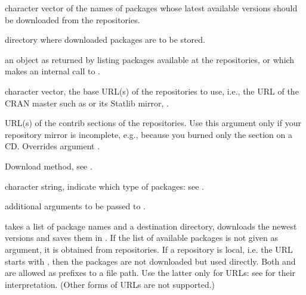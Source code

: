 \begin{Arguments}
\begin{ldescription}
\item[\code{pkgs}] 
character vector of the names of packages whose latest available
versions should be downloaded from the repositories.

\item[\code{destdir}] 
directory where downloaded packages are to be stored.

\item[\code{available}] 
an object as returned by 
listing packages available at the repositories, or  which
makes an internal call to .

\item[\code{repos}] 
character vector, the base URL(s) of the repositories
to use, i.e., the URL of the CRAN master such as
 or its Statlib mirror,
.

\item[\code{contriburl}] 
URL(s) of the contrib sections of the
repositories.  Use this argument only if your repository mirror is
incomplete, e.g., because you burned only the  section on a
CD.  Overrides argument .

\item[\code{method}] 
Download method, see .

\item[\code{type}] 
character string, indicate which type of packages: see
.

\item[\code{...}] 
additional arguments to be passed to
.

\end{ldescription}
\end{Arguments}
%
\begin{Details}\relax
{} takes a list of package names and a
destination directory, downloads the newest versions and saves them in
.  If the list of available packages is not given as
argument, it is obtained from repositories.  If a repository is local,
i.e. the URL starts with , then the packages are not
downloaded but used directly.  Both  and
 are allowed as prefixes to a file path.  Use the
latter only for URLs: see  for their interpretation.
(Other forms of  URLs are not supported.)
\end{Details}
